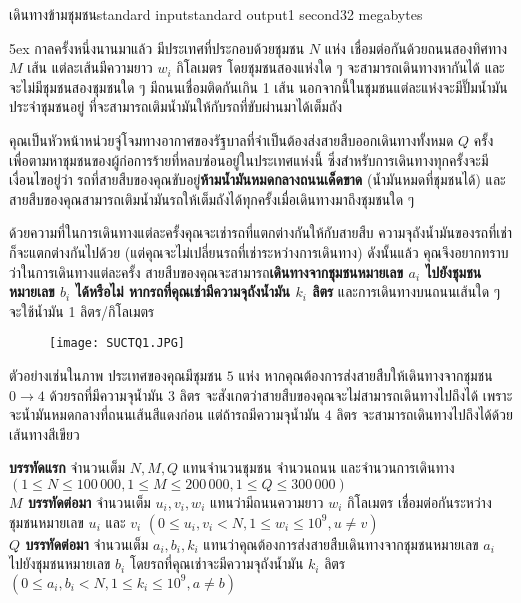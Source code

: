 \documentclass[11pt,a4paper]{article}
\begin{document}
\begin{problem}{เดินทางข้ามชุมชน}{standard input}{standard output}{1 second}{32 megabytes}



\parindent 5ex
กาลครั้งหนึ่งนานมาแล้ว มีประเทศที่ประกอบด้วยชุมชน $N$ แห่ง เชื่อมต่อกันด้วยถนนสองทิศทาง $M$ เส้น แต่ละเส้นมีความยาว $w_i$ กิโลเมตร โดยชุมชนสองแห่งใด ๆ จะสามารถเดินทางหากันได้ และจะไม่มีชุมชนสองชุมชนใด ๆ มีถนนเชื่อมติดกันเกิน 1 เส้น นอกจากนี้ในชุมชนแต่ละแห่งจะมีปั๊มน้ำมันประจำชุมชนอยู่ ที่จะสามารถเติมน้ำมันให้กับรถที่ขับผ่านมาได้เต็มถัง

คุณเป็นหัวหน้าหน่วยจู่โจมทางอากาศของรัฐบาลที่จำเป็นต้องส่งสายสืบออกเดินทางทั้งหมด $Q$ ครั้ง เพื่อตามหาชุมชนของผู้ก่อการร้ายที่หลบซ่อนอยู่ในประเทศแห่งนี้ ซึ่งสำหรับการเดินทางทุกครั้งจะมีเงื่อนไขอยู่ว่า รถที่สายสืบของคุณขับอยู่\textbf{ห้ามน้ำมันหมดกลางถนนเด็ดขาด} (น้ำมันหมดที่ชุมชนได้) และสายสืบของคุณสามารถเติมน้ำมันรถให้เต็มถังได้ทุกครั้งเมื่อเดินทางมาถึงชุมชนใด ๆ 

ด้วยความที่ในการเดินทางแต่ละครั้งคุณจะเช่ารถที่แตกต่างกันให้กับสายสืบ ความจุถังน้ำมันของรถที่เช่าก็จะแตกต่างกันไปด้วย (แต่คุณจะไม่เปลี่ยนรถที่เช่าระหว่างการเดินทาง) ดังนั้นแล้ว คุณจึงอยากทราบว่าในการเดินทางแต่ละครั้ง สายสืบของคุณจะสามารถ\textbf{เดินทางจากชุมชนหมายเลข $a_i$ ไปยังชุมชนหมายเลข $b_i$ ได้หรือไม่ หากรถที่คุณเช่ามีความจุถังน้ำมัน $k_i$ ลิตร} และการเดินทางบนถนนเส้นใด ๆ จะใช้น้ำมัน 1 ลิตร/กิโลเมตร
\begin{figure}[ht]
\centering
\texttt{[image: SUCTQ1.JPG]}
\end{figure}

ตัวอย่างเช่นในภาพ ประเทศของคุณมีชุมชน $5$ แห่ง หากคุณต้องการส่งสายสืบให้เดินทางจากชุมชน $0 \rightarrow 4$ ด้วยรถที่มีความจุน้ำมัน $3$ ลิตร จะสังเกตว่าสายสืบของคุณจะไม่สามารถเดินทางไปถึงได้ เพราะจะน้ำมันหมดกลางที่ถนนเส้นสีแดงก่อน แต่ถ้ารถมีความจุน้ำมัน $4$ ลิตร จะสามารถเดินทางไปถึงได้ด้วยเส้นทางสีเขียว

\InputFile
\textbf{บรรทัดแรก} จำนวนเต็ม $N, M, Q$ แทนจำนวนชุมชน จำนวนถนน และจำนวนการเดินทาง $(1\leq N \leq 100\,000, 1 \leq M \leq 200\,000, 1 \leq Q \leq 300\,000)$\\
\textbf{$M$ บรรทัดต่อมา} จำนวนเต็ม $u_i, v_i, w_i$ แทนว่ามีถนนความยาว $w_i$ กิโลเมตร เชื่อมต่อกันระหว่างชุมชนหมายเลข $u_i$ และ $v_i$ $(0 \leq u_i, v_i < N, 1 \leq w_i \leq 10^9, u \neq v)$\\
\textbf{$Q$ บรรทัดต่อมา} จำนวนเต็ม $a_i, b_i, k_i$ แทนว่าคุณต้องการส่งสายสืบเดินทางจากชุมชนหมายเลข $a_i$ ไปยังชุมชนหมายเลข $b_i$ โดยรถที่คุณเช่าจะมีความจุถังน้ำมัน $k_i$ ลิตร $(0 \leq a_i, b_i < N, 1 \leq k_i \leq 10^9, a \neq b)$


\end{problem}
\end{document}
